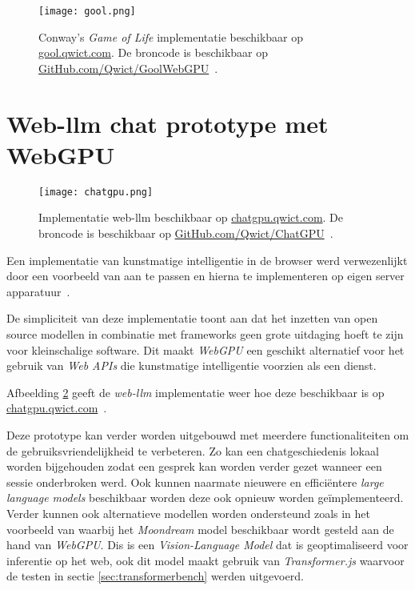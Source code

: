 \begin{figure}
    \texttt{[image: gool.png]}
    \caption[Conway's \textit{Game of Life} implementatie~\autocite{Qwict2024}]{
        Conway's \textit{Game of Life} implementatie beschikbaar op \href{https://gool.qwict.com}{gool.qwict.com}. De broncode is beschikbaar op \href{https://github.com/qwict/GoolWebGPU}{GitHub.com/Qwict/GoolWebGPU}~\autocite{google2023, Qwict2024}.
    }
    \label{fig:Conway's Game of Life}
\end{figure}

\break{}

\iffalse
TODO Dit moet verder in detail worden beschreven
\fi

\section{Web-llm chat prototype met WebGPU}
\label{sec:chatgpu}
\begin{figure}
    \texttt{[image: chatgpu.png]}
    \caption[Implementatie web-llm~\autocite{mlcai2023, Qwict2024a}]{
        Implementatie web-llm beschikbaar op \href{https://chatgpu.qwict.com}{chatgpu.qwict.com}. De broncode is beschikbaar op \href{https://github.com/qwict/chatgpu}{GitHub.com/Qwict/ChatGPU}~\autocite{mlcai2023, Qwict2024a}.
    }
    \label{fig:Implementatie web-llm}
\end{figure}

Een implementatie van kunstmatige intelligentie in de browser werd verwezenlijkt door een voorbeeld van \textcite{mlcai2023} aan te passen en hierna te implementeren op eigen server apparatuur~\autocite{Qwict2024a}.

\bigbreak{}

De simpliciteit van deze implementatie toont aan dat het inzetten van open source modellen in combinatie met frameworks geen grote uitdaging hoeft te zijn voor kleinschalige software. Dit maakt \textit{WebGPU} een geschikt alternatief voor het gebruik van \textit{Web APIs} die kunstmatige intelligentie voorzien als een dienst.

\bigbreak{}

Afbeelding \ref{fig:Implementatie web-llm} geeft de \textit{web-llm} implementatie weer hoe deze beschikbaar is op \href{https://chatgpu.qwict.com}{chatgpu.qwict.com}~\autocite{Qwict2024a}.

\bigbreak{}

Deze prototype kan verder worden uitgebouwd met meerdere functionaliteiten om de gebruiksvriendelijkheid te verbeteren. Zo kan een chatgeschiedenis lokaal worden bijgehouden zodat een gesprek kan worden verder gezet wanneer een sessie onderbroken werd. Ook kunnen naarmate nieuwere en efficiëntere \textit{large language models} beschikbaar worden deze ook opnieuw worden geïmplementeerd. Verder kunnen ook alternatieve modellen worden ondersteund zoals in het voorbeeld van \textcite{Lochner2024b} waarbij het \textit{Moondream} model beschikbaar wordt gesteld aan de hand van \textit{WebGPU}. Dis is een \textit{Vision-Language Model} dat is geoptimaliseerd voor inferentie op het web, ook dit model maakt gebruik van \textit{Transformer.js} waarvoor de testen in sectie \ref{sec:transformerbench} werden uitgevoerd.

